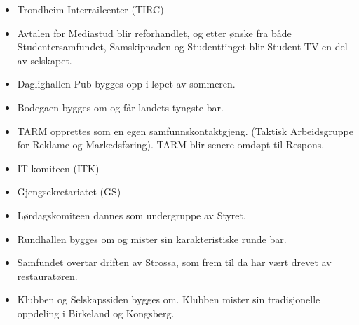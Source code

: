 
\begin{itemize}
  \item Trondheim Interrailcenter (TIRC) 
\end{itemize}


\begin{itemize}
  \item Avtalen for Mediastud blir reforhandlet, og etter ønske fra både Studentersamfundet, Samskipnaden og
Studenttinget blir Student-TV en del av selskapet.
\end{itemize}


\begin{itemize}
  \item Daglighallen Pub bygges opp i løpet av sommeren.
  \item Bodegaen bygges om og får landets tyngste bar.
\end{itemize}


\begin{itemize}
  \item  TARM opprettes som en egen samfunnskontaktgjeng. (Taktisk Arbeidsgruppe for Reklame og Markedsføring). TARM blir senere omdøpt til Respons.
\end{itemize}


\begin{itemize}
  \item IT-komiteen (ITK)
  \item Gjengsekretariatet (GS)
  \item Lørdagskomiteen dannes som undergruppe av Styret.
  \item Rundhallen bygges om og mister sin karakteristiske runde bar.
\end{itemize}


\begin{itemize}
  \item Samfundet overtar driften av Strossa, som frem til da har vært drevet av restauratøren. 
\end{itemize}


\begin{itemize}
  \item Klubben og Selskapssiden bygges om. Klubben mister sin tradisjonelle oppdeling i Birkeland og Kongsberg.
\end{itemize}

